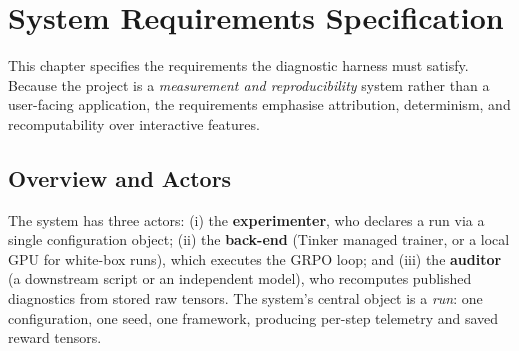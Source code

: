 \documentclass[12pt,a4paper]{report}
\begin{document}
\chapter{System Requirements Specification}
\label{ch:srs}

This chapter specifies the requirements the diagnostic harness must satisfy. Because
the project is a \emph{measurement and reproducibility} system rather than a
user-facing application, the requirements emphasise attribution, determinism, and
recomputability over interactive features.

\section{Overview and Actors}
The system has three actors: (i) the \textbf{experimenter}, who declares a run via a
single configuration object; (ii) the \textbf{back-end} (Tinker managed trainer, or
a local GPU for white-box runs), which executes the GRPO loop; and (iii) the
\textbf{auditor} (a downstream script or an independent model), who recomputes
published diagnostics from stored raw tensors. The system's central object is a
\emph{run}: one configuration, one seed, one framework, producing per-step telemetry
and saved reward tensors.
\end{document}
